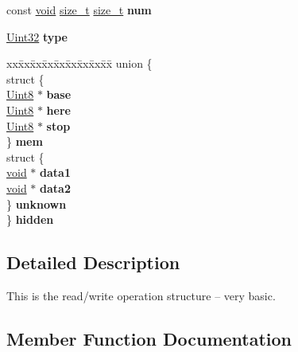 \begin{DoxyCompactItemize}
\item 
\hypertarget{structSDL__RWops_a630921d5c84cf48a4a10f9a75e1caa10}{}const \hyperlink{SDL__audio_8h_a52835ae37c4bb905b903cbaf5d04b05f}{void} \hyperlink{structSDL__RWops_acd9a3c6e840d285c1e30cadaf99097b2}{size\+\_\+t} \hyperlink{structSDL__RWops_acd9a3c6e840d285c1e30cadaf99097b2}{size\+\_\+t} {\bfseries num}\label{structSDL__RWops_a630921d5c84cf48a4a10f9a75e1caa10}

\item 
\hypertarget{structSDL__RWops_a099017bfceaac24ced0e4d08a4e0a023}{}\hyperlink{SDL__stdinc_8h_add440eff171ea5f55cb00c4a9ab8672d}{Uint32} {\bfseries type}\label{structSDL__RWops_a099017bfceaac24ced0e4d08a4e0a023}

\item 
\hypertarget{structSDL__RWops_a2bf0dec0395f771b30c841fc7296164b}{}\begin{tabbing}
xx\=xx\=xx\=xx\=xx\=xx\=xx\=xx\=xx\=\kill
union \{\\
\>struct \{\\
\>\>\hyperlink{SDL__stdinc_8h_a2944638813a090aa23e62f4da842c3e2}{Uint8} $\ast$ {\bfseries base}\\
\>\>\hyperlink{SDL__stdinc_8h_a2944638813a090aa23e62f4da842c3e2}{Uint8} $\ast$ {\bfseries here}\\
\>\>\hyperlink{SDL__stdinc_8h_a2944638813a090aa23e62f4da842c3e2}{Uint8} $\ast$ {\bfseries stop}\\
\>\} {\bfseries mem}\\
\>struct \{\\
\>\>\hyperlink{SDL__audio_8h_a52835ae37c4bb905b903cbaf5d04b05f}{void} $\ast$ {\bfseries data1}\\
\>\>\hyperlink{SDL__audio_8h_a52835ae37c4bb905b903cbaf5d04b05f}{void} $\ast$ {\bfseries data2}\\
\>\} {\bfseries unknown}\\
\} {\bfseries hidden}\label{structSDL__RWops_a2bf0dec0395f771b30c841fc7296164b}
\\

\end{tabbing}\end{DoxyCompactItemize}


\subsection{Detailed Description}
This is the read/write operation structure -- very basic. 

\subsection{Member Function Documentation}
\hypertarget{structSDL__RWops_ab303bcbb0f6742a141ba8b2998923f47}{}
